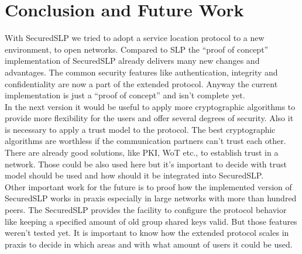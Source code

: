 \section{Conclusion and Future Work}
With SecuredSLP we tried to adopt a service location protocol to a new environment, to open networks. Compared to SLP the ``proof of concept'' implementation of SecuredSLP already delivers many new changes and advantages. The common security features like authentication, integrity and confidentiality are now a part of the extended protocol. Anyway the current implementation is just a ``proof of concept'' and isn't complete yet.\\
In the next version it would be useful to apply more cryptographic algorithms to provide more flexibility for the users and offer several degrees of security. Also it is necessary to apply a trust model to the protocol. The best cryptographic algorithms are worthless if the communication partners can't trust each other. There are already good solutions, like PKI, WoT etc., to establish trust in a network. Those could be also used here but it's important to decide with trust model should be used and how should it be integrated into SecuredSLP.\\  
Other important work for the future is to proof how the implemented version of SecuredSLP works in praxis especially in large networks with more than hundred peers. The SecuredSLP provides the facility to configure the protocol behavior like keeping a specified amount of old group shared keys valid. But those features weren't tested yet. It is important to know how the extended protocol scales in praxis to decide in which areas and with what amount of users it could be used.